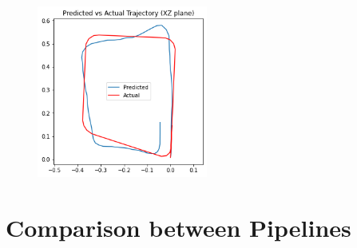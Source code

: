\begin{figure}[H]
{        \label{multiwarp_epi_20}
        \includegraphics[width=0.5\textwidth]{images/trajectories/multiwarp-focalstack-17-5.png}
    }
    
\end{figure}

\section{Comparison between Pipelines}




